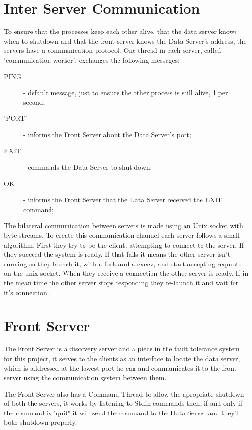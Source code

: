 \documentclass[12pt]{article} %
\begin{document}
\section{Inter Server Communication}
\label{sec:CommunicationProtocol}
To ensure that the processes keep each other alive, that the data server knows when 
to shutdown and  that the front server knows the Data Server's address, the servers 
have a communication protocol. One thread in each server, called 'communication 
worker', exchanges the following messages:
  \begin{description}
    \item[PING] - default message, just to ensure the other process is still alive, 1 per second;
    \item['PORT'] - informs the Front Server about the Data Server's port;
    \item[EXIT] - commands the Data Server to shut down;
    \item[OK] - informs the Front Server that the Data Server received the EXIT command;
  \end{description}

The bilateral communication between servers is made using an Unix socket with 
byte streams. To create this communication channel each server follows a small 
algorithm. First they try to be the client, attempting to connect to the server. 
If they succeed the system is ready. If that fails it means the other server isn't 
running so they launch it, with a fork and a execv, and start accepting requests 
on the unix socket. When they receive a connection the other server is ready. If 
in the mean time the other server stops responding they re-launch it and wait for 
it's connection.

\section{Front Server}
\label{sec:FrontServer}

The Front Server is a discovery server and a piece in the fault tolerance system for this project,
it serves to the clients as an interface to locate the data server, which is addressed at the lowest port he can
and communicates it to the front server using the communication system between them.

The Front Server also has a Command Thread to allow the apropriate shutdown of both the servers,
it works by listening to Stdin commands then, if and only if the command is "quit" it will send the command
to the Data Server and they'll both shutdown properly.
\end{document}
